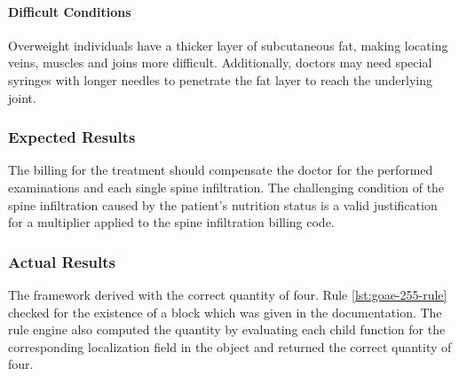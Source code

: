 \paragraph{Difficult Conditions}
Overweight individuals have a thicker layer of subcutaneous fat, making locating veins, muscles and joins more difficult.
Additionally, doctors may need special syringes with longer needles to penetrate the fat layer to reach the underlying joint.


\subsubsection{Expected Results}
The billing for the treatment should compensate the doctor for the performed examinations and each single spine infiltration.
The challenging condition of the spine infiltration caused by the patient's nutrition status is a valid justification for a multiplier applied to the spine infiltration billing code.


\subsubsection{Actual Results}

The framework derived  with the correct quantity of four.
Rule \ref{lst:goae-255-rule} checked for the existence of a  block which was given in the documentation.
The rule engine also computed the quantity by evaluating each child function for the corresponding localization field in the  object and returned the correct quantity of four.







